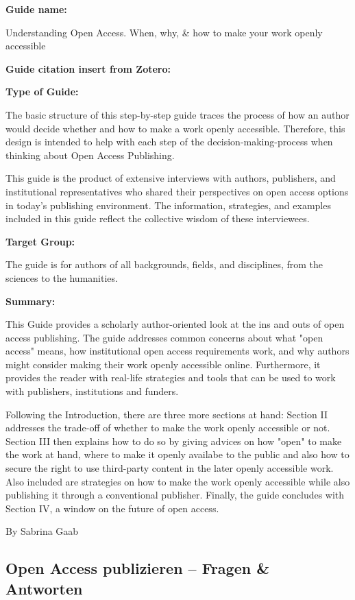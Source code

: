 \documentclass{article}
\begin{document}
\textbf{Guide name:} 

Understanding Open Access. When, why, \& how to make your work openly accessible


\textbf{Guide citation insert from Zotero:} 

\autocite{rubow_understanding_2015}


\textbf{Type of Guide:}

The basic structure of this step-by-step guide traces the process of how an author would decide whether and how to make a work openly accessible. Therefore, this design is intended to help with each step of the decision-making-process when thinking about Open Access Publishing. 


This guide is the product of extensive interviews with authors, publishers, and institutional representatives who shared their perspectives on open access options in today’s publishing environment. The information, strategies, and examples included in this guide reflect the collective wisdom of these interviewees.


\textbf{Target Group:}

The guide is for authors of all backgrounds, fields, and disciplines, from the sciences to the humanities.


\textbf{Summary:}

This Guide provides a scholarly author-oriented look at the ins and outs of open access publishing. The guide addresses common concerns about what "open access" means, how institutional open access requirements work, and why authors might consider making their work openly accessible online. Furthermore, it provides the reader with real-life strategies and tools that can be used to work with publishers, institutions and funders.


Following the Introduction, there are three more sections at hand: Section II addresses the trade-off of whether to make the work openly accessible or not. Section III then explains how to do so by giving advices on how "open" to make the work at hand, where to make it openly availabe to the public and also how to secure the right to use third-party content in the later openly accessible work. Also included are strategies on how to make the work openly accessible while also publishing it through a conventional publisher. Finally, the guide concludes with Section IV, a window on the future of open access.


By Sabrina Gaab 


\subsection{Open Access publizieren – Fragen \& Antworten}\label{H4741497}
\end{document}

